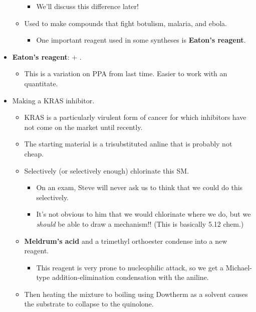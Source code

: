 \documentclass[../notes.tex]{subfiles}
\begin{document}
\begin{itemize}
\begin{itemize}
\begin{itemize}
            \item We'll discuss this difference later!
        \end{itemize}
        \item Used to make compounds that fight botulism, malaria, and ebola.
        \begin{itemize}
            \item One important reagent used in some syntheses is \textbf{Eaton's reagent}.
        \end{itemize}
    \end{itemize}
    \item \textbf{Eaton's reagent}:  + .
    \begin{itemize}
        \item This is a variation on PPA from last time. Easier to work with an quantitate.
    \end{itemize}
    \item Making a KRAS inhibitor.
    \begin{itemize}
        \item KRAS is a particularly virulent form of cancer for which inhibitors have not come on the market until recently.
        \item The starting material is a trisubstituted anline that is probably not cheap.
        \item Selectively (or selectively enough) chlorinate this SM.
        \begin{itemize}
            \item On an exam, Steve will never ask us to think that we could do this selectively.
            \item It's not obvious to him that we would chlorinate where we do, but we \emph{should} be able to draw a mechanism!! (This is basically 5.12 chem.)
        \end{itemize}
        \item \textbf{Meldrum's acid} and a trimethyl orthoester condense into a new reagent.
        \begin{itemize}
            \item This reagent is very prone to nucleophilic attack, so we get a Michael-type addition-elimination condensation with the aniline.
        \end{itemize}
        \item Then heating the mixture to boiling using Dowtherm as a solvent causes the substrate to collapse to the quinolone.
        \begin{itemize}

\end{itemize}
\end{itemize}
\end{itemize}
\end{document}
